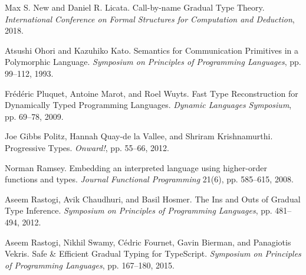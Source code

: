 \documentclass[screen=true, 10pt, acmsmall]{acmart}
\newenvironment{SingleColumn}{\begin{list}{}{\topsep=0pt\partopsep=0pt%
\listparindent=0pt\itemindent=0pt\labelwidth=0pt\leftmargin=0pt\rightmargin=0pt%
\itemsep=0pt\parsep=0pt}\item}{\end{list}}
\newenvironment{AutoBibliography}{\begin{small}}{\end{small}}
\newcommand{\Autobibentry}[1]{\hspace{0.05\linewidth}\parbox[t]{0.95\linewidth}{\parindent=-0.05\linewidth#1\vspace{1.0ex}}}
\begin{document}
\begin{AutoBibliography}
\begin{SingleColumn}
\label{t:x28autobib_x22Max_Sx2e_New_and_Daniel_Rx2e_LicataCallx2dbyx2dname_Gradual_Type_TheoryInternational_Conference_on_Formal_Structures_for_Computation_and_Deduction2018x22x29}\Autobibentry{Max S. New and Daniel R. Licata. Call{-}by{-}name Gradual Type Theory. \textit{International Conference on Formal Structures for Computation and Deduction}, 2018.}

\label{t:x28autobib_x22Atsushi_Ohori_and_Kazuhiko_KatoSemantics_for_Communication_Primitives_in_a_Polymorphic_LanguageSymposium_on_Principles_of_Programming_Languagesx2c_ppx2e_99x2dx2d1121993x22x29}\Autobibentry{Atsushi Ohori and Kazuhiko Kato. Semantics for Communication Primitives in a Polymorphic Language. \textit{Symposium on Principles of Programming Languages}, pp. 99{--}112, 1993.}

\label{t:x28autobib_x22Frxe9dxe9ric_Pluquetx2c_Antoine_Marotx2c_and_Roel_WuytsFast_Type_Reconstruction_for_Dynamically_Typed_Programming_LanguagesDynamic_Languages_Symposiumx2c_ppx2e_69x2dx2d782009x22x29}\Autobibentry{Fr\'{e}d\'{e}ric Pluquet, Antoine Marot, and Roel Wuyts. Fast Type Reconstruction for Dynamically Typed Programming Languages. \textit{Dynamic Languages Symposium}, pp. 69{--}78, 2009.}

\label{t:x28autobib_x22Joe_Gibbs_Politzx2c_Hannah_Quayx2dde_la_Valleex2c_and_Shriram_KrishnamurthiProgressive_TypesOnwardx21x2c_ppx2e_55x2dx2d662012x22x29}\Autobibentry{Joe Gibbs Politz, Hannah Quay{-}de la Vallee, and Shriram Krishnamurthi. Progressive Types. \textit{Onward!}, pp. 55{--}66, 2012.}

\label{t:x28autobib_x22Norman_RamseyEmbedding_an_interpreted_language_using_higherx2dorder_functions_and_typesJournal_Functional_Programming_21x286x29x2c_ppx2e_585x2dx2d6152008x22x29}\Autobibentry{Norman Ramsey. Embedding an interpreted language using higher{-}order functions and types. \textit{Journal Functional Programming} 21(6), pp. 585{--}615, 2008.}

\label{t:x28autobib_x22Aseem_Rastogix2c_Avik_Chaudhurix2c_and_Basil_HosmerThe_Ins_and_Outs_of_Gradual_Type_InferenceSymposium_on_Principles_of_Programming_Languagesx2c_ppx2e_481x2dx2d4942012x22x29}\Autobibentry{Aseem Rastogi, Avik Chaudhuri, and Basil Hosmer. The Ins and Outs of Gradual Type Inference. \textit{Symposium on Principles of Programming Languages}, pp. 481{--}494, 2012.}

\label{t:x28autobib_x22Aseem_Rastogix2c_Nikhil_Swamyx2c_Cxe9dric_Fournetx2c_Gavin_Biermanx2c_and_Panagiotis_VekrisSafe_x26_Efficient_Gradual_Typing_for_TypeScriptSymposium_on_Principles_of_Programming_Languagesx2c_ppx2e_167x2dx2d1802015x22x29}\Autobibentry{Aseem Rastogi, Nikhil Swamy, C\'{e}dric Fournet, Gavin Bierman, and Panagiotis Vekris. Safe \& Efficient Gradual Typing for TypeScript. \textit{Symposium on Principles of Programming Languages}, pp. 167{--}180, 2015.}


\end{SingleColumn}
\end{AutoBibliography}
\end{document}
